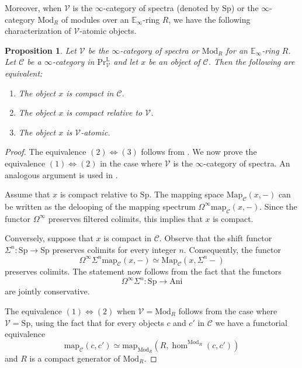 \documentclass[oneside, hidelinks, 12pt, a4paper,reqno]{amsart}
\theoremstyle{plain}
\theoremstyle{definition}
\theoremstyle{plain}
\newtheorem{proposition}[proposition]{Proposition}
\newcommand{\rL}{\mathrm L}
\newcommand{\cC}{\mathscr C}
\newcommand{\cV}{\mathscr V}
\newcommand{\bbE}{\mathbb E}
\newcommand{\cat}{$\infty$-category }
\newcommand{\LPr}{\mathrm{Pr}^\rL}
\newcommand{\Mod}{\mathrm{Mod}}
\newcommand{\Map}{\mathrm{Map}}
\newcommand{\map}{\mathrm{map}}
\newcommand{\Ani}{\mathrm{Ani}}
\begin{document}
Moreover, when $\cV$ is the \cat of spectra (denoted by $\mathrm{Sp}$) or the \cat $\Mod_{R}$ of modules over an $\bbE_{\infty}$-ring $R$, we have the following characterization of $\cV$-atomic objects.

\begin{proposition}\label{prop: compact over Sp}
    Let $\cV$ be the \cat of spectra or $\Mod_{R}$ for an $\bbE_{\infty}$-ring $R$. Let $\cC$ be a \cat in $\LPr_{\cV}$ and let $x$ be an object of $\cC$. Then the following are equivalent:
    \begin{enumerate}
        \item The object $x$ is compact in $\cC$.
        \item The object $x$ is compact relative to $\cV$.
        \item The object $x$ is $\cV$-atomic.
    \end{enumerate}
\end{proposition}

\begin{proof}
    The equivalence $(2) \Leftrightarrow (3)$ follows from . We now prove the equivalence $(1) \Leftrightarrow (2)$ in the case where $\cV$ is the \cat of spectra. An analogous argument is used in \cite[Proposition 2.8]{Ben_Moshe_2023}.
    
    Assume that $x$ is compact relative to $\mathrm{Sp}$. The mapping space $\Map_{\cC}(x,-)$ can be written as the delooping of the mapping spectrum $\Omega^{\infty}\mathrm{map}_{\cC}(x,-)$. Since the functor $\Omega^{\infty}$ preserves filtered colimits, this implies that $x$ is compact.
    
    Conversely, suppose that $x$ is compact in $\cC$. Observe that the shift functor $\Sigma^{n}\colon \mathrm{Sp} \to \mathrm{Sp}$ preserves colimits for every integer $n$. Consequently, the functor
    \[
    \Omega^{\infty}\Sigma^{n}\mathrm{map}_{\cC}(x,-) \simeq \Map_{\cC}(x,\Sigma^{n}-)
    \]
    preserves colimits. The statement now follows from the fact that the functors
    \[
    \Omega^{\infty}\Sigma^{n}: \mathrm{Sp} \to \Ani
    \]
    are jointly conservative.
    
    The equivalence $(1) \Leftrightarrow (2)$ when $\cV = \Mod_{R}$ follows from the case where $\cV = \mathrm{Sp}$, using the fact that for every objects $c$ and $c'$ in $\cC$ we have a functorial equivalence 
    \[
    \map_{\cC}(c,c') \simeq \map_{\Mod_{R}}(R, \hom^{\Mod_{R}}(c,c'))
    \]
    and $R$ is a compact generator of $\Mod_{R}$.
\end{proof}

\end{document}
